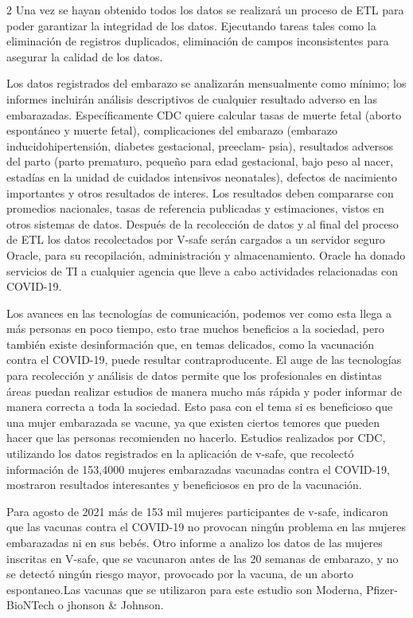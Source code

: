 \documentclass[12pt,spanish,Letterpaper,openany]{book}
\begin{document}
\begin {multicols}{2}
Una vez se hayan obtenido todos los datos se realizará un proceso de ETL para poder garantizar la integridad de los
datos. Ejecutando tareas tales como la eliminación de registros duplicados, eliminación de campos inconsistentes
para asegurar la calidad de los datos.

Los datos registrados del embarazo se analizarán mensualmente como mínimo; los informes incluirán análisis
descriptivos de cualquier resultado adverso en las embarazadas. Específicamente CDC quiere calcular tasas de
muerte fetal (aborto espontáneo y muerte fetal), complicaciones del embarazo (embarazo inducidohipertensión,
diabetes gestacional, preeclam-
psia), resultados adversos del parto (parto prematuro, pequeño para edad gestacional,
bajo peso al nacer, estadías en la unidad de cuidados intensivos neonatales), defectos de nacimiento importantes y
otros resultados de interes. Los resultados deben compararse con promedios nacionales, tasas de referencia
publicadas y estimaciones, vistos en otros sistemas de datos. Después de la recolección de datos y al final del proceso
de ETL los datos recolectados por V-safe serán cargados a un servidor seguro Oracle, para su recopilación,
administración y almacenamiento. Oracle ha donado servicios de TI a cualquier agencia que lleve a cabo actividades
relacionadas con COVID-19.

Los avances en las tecnologías de comunicación, podemos ver como esta llega a más personas en poco tiempo, esto
trae muchos beneficios a la sociedad, pero también existe desinformación que, en temas delicados, como la
vacunación contra el COVID-19, puede resultar contraproducente. El auge de las tecnologías para recolección y
análisis de datos permite que los profesionales en distintas áreas puedan realizar estudios de manera mucho más
rápida y poder informar de manera correcta a toda la sociedad. Esto pasa con el tema si es beneficioso que una mujer
embarazada se vacune, ya que existen ciertos temores que pueden hacer que las personas recomienden no hacerlo.
Estudios realizados por CDC, utilizando los datos registrados en la aplicación de v-safe, que recolectó información
de 153,4000 mujeres embarazadas vacunadas contra el COVID-19, mostraron resultados interesantes y beneficiosos
en pro de la vacunación.

Para agosto de 2021 más de 153 mil mujeres participantes de v-safe, indicaron que las vacunas contra el COVID-19
no provocan ningún problema en las mujeres embarazadas ni en sus bebés. Otro informe a analizo los datos de las
mujeres inscritas en V-safe, que se vacunaron antes de las 20 semanas de embarazo, y no se detectó ningún riesgo
mayor, provocado por la vacuna, de un aborto espontaneo.Las vacunas que se utilizaron para este estudio son
Moderna, Pfizer-BioNTech o jhonson \& Johnson.


\end{multicols}
\end{document}
